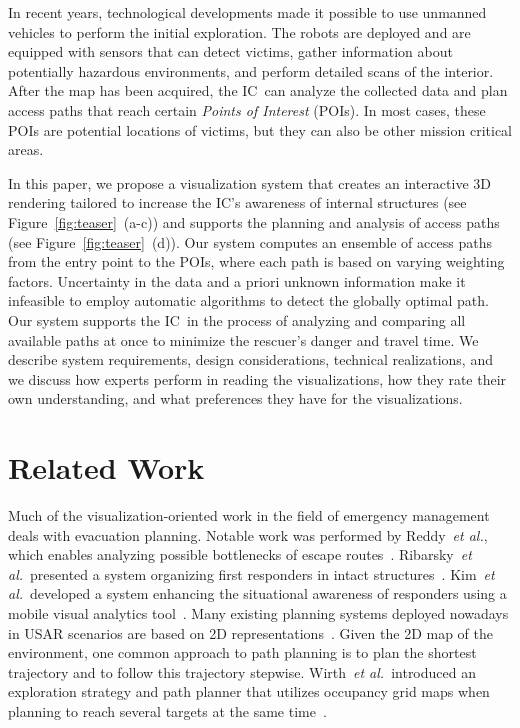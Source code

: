 \documentclass{egpubl}
\def\etal{\textit{et al.}}
\def\IC{IC}
\begin{document}
In recent years, technological developments made it possible to use unmanned vehicles to perform the initial exploration. The robots are deployed and are equipped with sensors that can detect victims, gather information about potentially hazardous environments, and perform detailed scans of the interior. After the map has been acquired, the \IC\ can analyze the collected data and plan access paths that reach certain \emph{Points of Interest} (POIs). In most cases, these POIs are potential locations of victims, but they can also be other mission critical areas.

In this paper, we propose a visualization system that creates an interactive 3D rendering tailored to increase the \IC 's awareness of internal structures (see Figure~\ref{fig:teaser}~(a-c)) and supports the planning and analysis of access paths (see Figure~\ref{fig:teaser}~(d)). Our system computes an ensemble of access paths from the entry point to the POIs, where each path is based on varying weighting factors. Uncertainty in the data and a priori unknown information make it infeasible to employ automatic algorithms to detect the globally optimal path. Our system supports the \IC\ in the process of analyzing and comparing all available paths at once to minimize the rescuer's danger and travel time. We describe system requirements, design considerations, technical realizations, and we discuss how experts perform in reading the visualizations, how they rate their own understanding, and what preferences they have for the visualizations.


\section{Related Work} \label{sec:relatedwork}
 Much of the visualization-oriented work  in the field of emergency management deals with evacuation planning. Notable work was performed by Reddy~\etal, which enables analyzing possible bottlenecks of escape routes~\cite{EuroVA12:13-17:2012}. Ribarsky~\etal\ presented a system organizing first responders in intact structures~\cite{Ribarsky:2010}. Kim~\etal\ developed a system enhancing the situational awareness of responders using a mobile visual analytics tool~\cite{Kim:2008}. Many existing planning systems deployed nowadays in USAR scenarios are based on 2D representations~\cite{kleiner_et_al_ssrr09,KohlbrecherMeyerStrykKlingaufFlexibleSlamSystem2011}. Given the 2D map of the environment, one common approach to path planning is to plan the shortest trajectory and to follow this trajectory stepwise. Wirth~\etal\ introduced an exploration strategy and path planner that utilizes occupancy grid maps when planning to reach several targets at the same time~\cite{Wirth2007ETA1}. 
\end{document}
